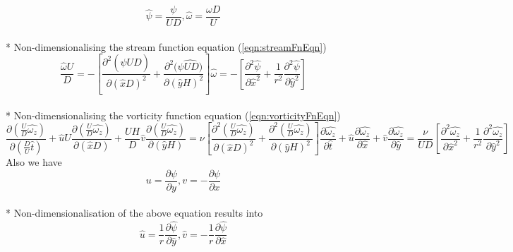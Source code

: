 \documentclass{article}
\begin{document}
\begin{equation}
\hat{\psi}=\frac{\psi}{UD},  \hat{\omega}=\frac{\omega D}{U}
\end{equation}
\\*
Non-dimensionalising the stream function equation (\ref{eqn:streamFnEqn})
\begin{subequations}
\begin{equation}
\frac{\hat{\omega} U}{D} = -\left[\frac{\partial^2 (\hat{\psi}UD)}{\partial (\hat{x}D)^2} +  \frac{\partial^2 (\hat{\psi UD)}}{\partial (\hat{y}H)^2}\right]
\end{equation}
\begin{equation}
\label{eqn:streamFnEqn3}
\hat{\omega} = -\left[\frac{\partial^2 \hat{\psi}}{\partial \hat{x}^2} +  \frac{1}{r^2}\frac{\partial^2 \hat{\psi}}{\partial \hat{y}^2}\right]
\end{equation}
\end{subequations}
\\*
Non-dimensionalising the vorticity function equation (\ref{eqn:vorticityFnEqn})
\begin{subequations}
\begin{equation}
\frac{\partial \left(\frac{U}{D}\hat{\omega_z}\right)}{\partial \left(\frac{D}{U}\hat{t}\right)} + \hat{u}U\frac{\partial \left(\frac{U}{D}\hat{\omega_z}\right)}{\partial (\hat{x}D)} + \frac{UH}{D}\hat{v}\frac{\partial \left(\frac{U}{D}\hat{\omega_z}\right)}{\partial (\hat{y}H)}= \nu \left [ \frac{\partial^2 \left(\frac{U}{D}\hat{\omega_z}\right)}{\partial (\hat{x}D)^2} +  \frac{\partial^2 \left(\frac{U}{D}\hat{\omega_z}\right)}{\partial (\hat{y}H)^2} \right ]
\end{equation}
\begin{equation}
\label{eqn:vorticityEqn2}
\frac{\partial \hat{\omega_z}}{\partial \hat{t}} + \hat{u}\frac{\partial \hat{\omega_z}}{\partial \hat{x}} + \hat{v}\frac{\partial \hat{\omega_z}}{\partial \hat{y}}= \frac{\nu}{UD} \left [ \frac{\partial^2 \hat{\omega_z}}{\partial \hat{x}^2} +  \frac{1}{r^2}\frac{\partial^2 \hat{\omega_z}}{\partial \hat{y}^2} \right ]
\end{equation}
\end{subequations}
Also we have 
\begin{equation}
\label{eqn:vorticityEqn3}
u=\frac{\partial \psi}{\partial y} , v=-\frac{\partial \psi}{\partial x}
\end{equation}
\\*
Non-dimensionalisation of the above equation results into
\begin{equation}
\label{eqn:streamFnEqn2}
\hat{u}=\frac{1}{r}\frac{\partial \hat{\psi}}{\partial \hat{y}} , \hat{v}=-\frac{1}{r}\frac{\partial \hat{\psi}}{\partial \hat{x}}
\end{equation}
\end{document}

